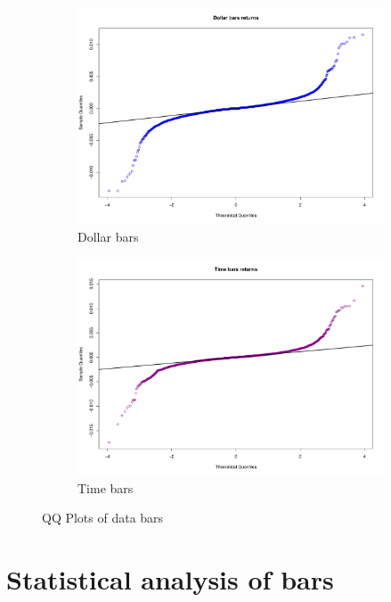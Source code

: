 \begin{figure}[htbp]
	\begin{subfigure}{.5\textwidth}
		\centering
		\includegraphics[scale=.25]{img/dataBars/dollarQQPlot}
		\caption{Dollar bars}
	\end{subfigure}%
	\begin{subfigure}{.5\textwidth}
		\centering
		\includegraphics[scale=.25]{img/dataBars/timeQQPlot}
		\caption{Time bars}
	\end{subfigure}%
	
	\caption{QQ Plots of data bars}
	\label{fig:QQPlotsDataBars}
\end{figure}

\newpage

\section{Statistical analysis of bars}

